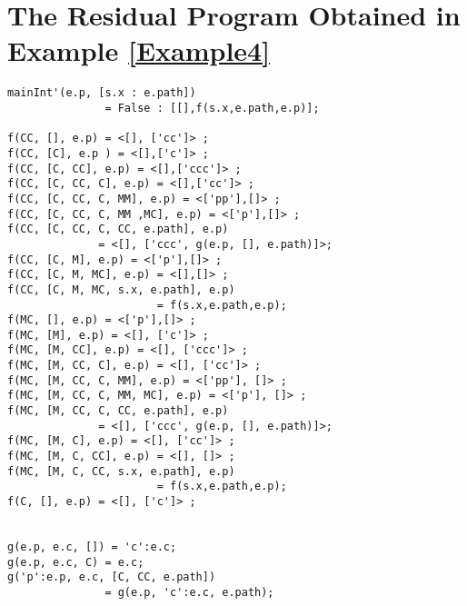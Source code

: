 \documentclass[preprint]{sigplanconf}
\begin{document}
\appendix
\section{The Residual Program Obtained in Example \ref{Example4}}\label{Appendix}

\noindent
\begin{verbatim}
mainInt'(e.p, [s.x : e.path]) 
               = False : [[],f(s.x,e.path,e.p)];

f(CC, [], e.p) = <[], ['cc']> ;
f(CC, [C], e.p ) = <[],['c']> ;
f(CC, [C, CC], e.p) = <[],['ccc']> ;
f(CC, [C, CC, C], e.p) = <[],['cc']> ;
f(CC, [C, CC, C, MM], e.p) = <['pp'],[]> ;
f(CC, [C, CC, C, MM ,MC], e.p) = <['p'],[]> ;
f(CC, [C, CC, C, CC, e.path], e.p) 
              = <[], ['ccc', g(e.p, [], e.path)]>;
f(CC, [C, M], e.p) = <['p'],[]> ;
f(CC, [C, M, MC], e.p) = <[],[]> ;
f(CC, [C, M, MC, s.x, e.path], e.p) 
                       = f(s.x,e.path,e.p);
f(MC, [], e.p) = <['p'],[]> ;
f(MC, [M], e.p) = <[], ['c']> ;
f(MC, [M, CC], e.p) = <[], ['ccc']> ;
f(MC, [M, CC, C], e.p) = <[], ['cc']> ;
f(MC, [M, CC, C, MM], e.p) = <['pp'], []> ;
f(MC, [M, CC, C, MM, MC], e.p) = <['p'], []> ;
f(MC, [M, CC, C, CC, e.path], e.p) 
              = <[], ['ccc', g(e.p, [], e.path)]>;
f(MC, [M, C], e.p) = <[], ['cc']> ;
f(MC, [M, C, CC], e.p) = <[], []> ;
f(MC, [M, C, CC, s.x, e.path], e.p)
                       = f(s.x,e.path,e.p);
f(C, [], e.p) = <[], ['c']> ;


g(e.p, e.c, []) = 'c':e.c;
g(e.p, e.c, C) = e.c;
g('p':e.p, e.c, [C, CC, e.path]) 
               = g(e.p, 'c':e.c, e.path); 

\end{verbatim}




\end{document}
